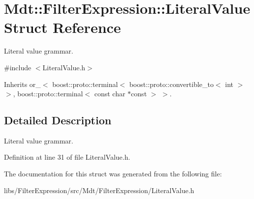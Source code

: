 \hypertarget{struct_mdt_1_1_filter_expression_1_1_literal_value}{}\section{Mdt\+:\+:Filter\+Expression\+:\+:Literal\+Value Struct Reference}
\label{struct_mdt_1_1_filter_expression_1_1_literal_value}


Literal value grammar.  




{\ttfamily \#include $<$Literal\+Value.\+h$>$}



Inherits or\+\_\+$<$ boost\+::proto\+::terminal$<$ boost\+::proto\+::convertible\+\_\+to$<$ int $>$ $>$, boost\+::proto\+::terminal$<$ const char $\ast$const  $>$ $>$.



\subsection{Detailed Description}
Literal value grammar. 

Definition at line 31 of file Literal\+Value.\+h.



The documentation for this struct was generated from the following file\+:\begin{DoxyCompactItemize}
\item 
libs/\+Filter\+Expression/src/\+Mdt/\+Filter\+Expression/Literal\+Value.\+h\end{DoxyCompactItemize}
